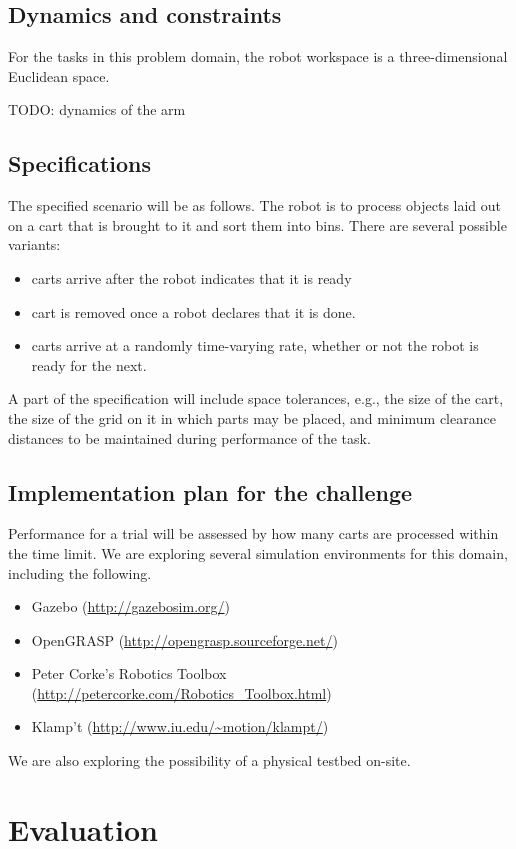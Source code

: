 \documentclass{amsart}
\theoremstyle{definition}
\begin{document}
\subsection{Dynamics and constraints}
For the tasks in this problem domain, the robot workspace is a three-dimensional
Euclidean space.

TODO: dynamics of the arm


\subsection{Specifications}
The specified scenario will be as follows. The robot is to process objects laid out on a cart that 
is brought to it and sort them into bins. There are several possible variants:
\begin{itemize}
\item carts arrive after the robot indicates that it is ready
\item cart is removed once a robot declares that it is done.
\item carts arrive at a randomly time-varying rate, whether or not the robot is ready for the next.
\end{itemize}
A part of the specification will include space tolerances, e.g., the size of the
cart, the size of the grid on it in which parts may be placed, and minimum
clearance distances to be maintained during performance of the task.


\subsection{Implementation plan for the challenge}

Performance for a trial will be assessed by how many carts are processed within the time limit.
We are exploring several simulation environments for this domain, including the following.
\begin{itemize}
\item Gazebo (\url{http://gazebosim.org/})
\item OpenGRASP (\url{http://opengrasp.sourceforge.net/})
\item Peter Corke's Robotics Toolbox
(\url{http://petercorke.com/Robotics_Toolbox.html})
\item Klamp't (\url{http://www.iu.edu/~motion/klampt/})
\end{itemize}

We are also exploring the possibility of a physical testbed on-site.

\section{Evaluation}
\end{document}
